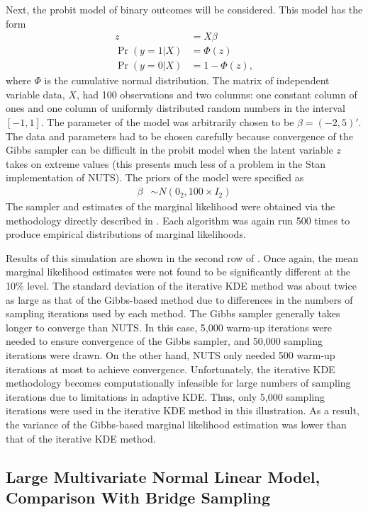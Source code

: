 \documentclass[twocolumn]{article}
\begin{document}
Next, the probit model of binary outcomes will be considered. This model has the form
\begin{subequations}
\begin{align}
	z &= X\beta \\
	\Pr(y=1|X) &= \Phi(z) \\
	\Pr(y=0|X) &= 1 - \Phi(z),
\end{align}
\end{subequations}
where $\Phi$ is the cumulative normal distribution. The matrix of independent variable data, $X$, had 100 observations and two columns: one constant column of ones and one column of uniformly distributed random numbers in the interval $[-1, 1]$. The parameter of the model was arbitrarily chosen to be $\beta = (-2, 5)'$. The data and parameters had to be chosen carefully because convergence of the Gibbs sampler can be difficult in the probit model when the latent variable $z$ takes on extreme values (this presents much less of a problem in the Stan implementation of NUTS). The priors of the model were specified as
\begin{align}
	\beta &\sim N(0_2, 100 \times I_2)
\end{align}
The sampler and estimates of the marginal likelihood were obtained via the methodology directly described in \cite{Chib}. Each algorithm was again run 500 times to produce empirical distributions of marginal likelihoods.

Results of this simulation are shown in the second row of . Once again, the mean marginal likelihood estimates were not found to be significantly different at the 10\% level. The standard deviation of the iterative KDE method was about twice as large as that of the Gibbs-based method due to differences in the numbers of sampling iterations used by each method. The Gibbs sampler generally takes longer to converge than NUTS. In this case, 5,000 warm-up iterations were needed to ensure convergence of the Gibbs sampler, and 50,000 sampling iterations were drawn. On the other hand, NUTS only needed 500 warm-up iterations at most to achieve convergence. Unfortunately, the iterative KDE methodology becomes computationally infeasible for large numbers of sampling iterations due to limitations in adaptive KDE. Thus, only 5,000 sampling iterations were used in the iterative KDE method in this illustration. As a result, the variance of the Gibbs-based marginal likelihood estimation was lower than that of the iterative KDE method.

\subsection{Large Multivariate Normal Linear Model, Comparison With Bridge Sampling}
\label{sec:BridgeSimulation}
\end{document}
